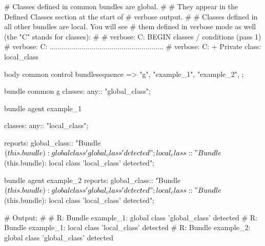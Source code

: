 \begin{codelisting}
\end{codelisting}
\begin{codelisting}
\begin{code}
# Classes defined in common bundles are global.
#
# They appear in the Defined Classes section at the start of
# verbose output.
#
# Classes defined in all other bundles are local. You will see
# them defined in verbose mode as well (the "C" stands for classes):
#
# verbose: C: BEGIN classes / conditions (pass 1)
# verbose: C: .........................................................
# verbose: C:     +  Private class: local_class

body common control
{
  bundlesequence => {
                      "g",
                      "example_1",
                      "example_2",
                    };
}


bundle common g {
  classes:
    any::
      "global_class";
}


bundle agent example_1
{
  classes:
    any::
      "local_class";

  reports:
    global_class:: "Bundle $(this.bundle): global class 'global_class' detected";
    local_class::  "Bundle $(this.bundle): local class 'local_class' detected";
}


bundle agent example_2
{
  reports:
    global_class:: "Bundle $(this.bundle): global class 'global_class' detected";
    local_class::  "Bundle $(this.bundle): local class 'local_class' detected";
}

# Output:
#
# R: Bundle example_1: global class 'global_class' detected
# R: Bundle example_1: local class 'local_class' detected
# R: Bundle example_2: global class 'global_class' detected
\end{code}
\end{codelisting}
